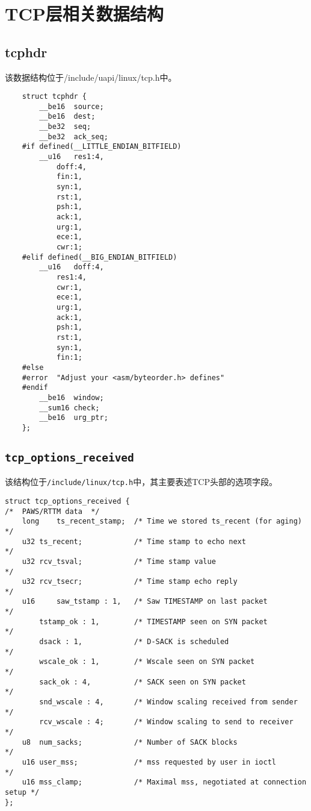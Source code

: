     \section{TCP层相关数据结构}
        \subsection{tcphdr}
            该数据结构位于/include/uapi/linux/tcp.h中。
\begin{verbatim}
    struct tcphdr {
        __be16  source;
        __be16  dest;
        __be32  seq;
        __be32  ack_seq;
    #if defined(__LITTLE_ENDIAN_BITFIELD)
        __u16   res1:4,
            doff:4,
            fin:1,
            syn:1,
            rst:1,
            psh:1,
            ack:1,
            urg:1,
            ece:1,
            cwr:1;
    #elif defined(__BIG_ENDIAN_BITFIELD)
        __u16   doff:4,
            res1:4,
            cwr:1,
            ece:1,
            urg:1,
            ack:1,
            psh:1,
            rst:1,
            syn:1,
            fin:1;
    #else
    #error  "Adjust your <asm/byteorder.h> defines"
    #endif  
        __be16  window;
        __sum16 check;
        __be16  urg_ptr;
    };
\end{verbatim}

        \subsection{\texttt{tcp_options_received}}

		该结构位于\texttt{/include/linux/tcp.h}中，其主要表述TCP头部的选项字段。

\begin{verbatim}
struct tcp_options_received {
/*  PAWS/RTTM data  */
    long    ts_recent_stamp;  /* Time we stored ts_recent (for aging)        */
    u32 ts_recent;            /* Time stamp to echo next                     */
    u32 rcv_tsval;            /* Time stamp value                            */
    u32 rcv_tsecr;            /* Time stamp echo reply                       */
    u16     saw_tstamp : 1,   /* Saw TIMESTAMP on last packet                */
        tstamp_ok : 1,        /* TIMESTAMP seen on SYN packet                */
        dsack : 1,            /* D-SACK is scheduled                         */
        wscale_ok : 1,        /* Wscale seen on SYN packet                   */
        sack_ok : 4,          /* SACK seen on SYN packet                     */
        snd_wscale : 4,       /* Window scaling received from sender         */
        rcv_wscale : 4;       /* Window scaling to send to receiver          */
    u8  num_sacks;            /* Number of SACK blocks                       */
    u16 user_mss;             /* mss requested by user in ioctl              */
    u16 mss_clamp;            /* Maximal mss, negotiated at connection setup */
};
\end{verbatim}            
